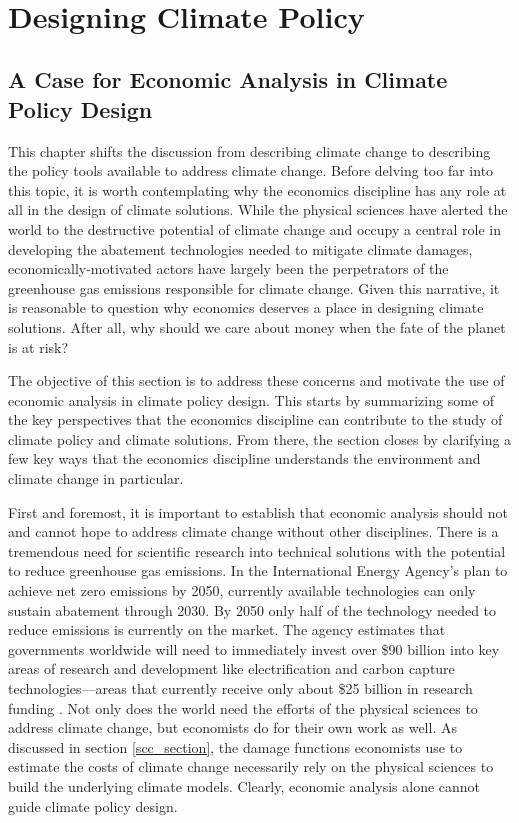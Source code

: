 ~

\newpage
\section{Designing Climate Policy}

\subsection{A Case for Economic Analysis in Climate Policy Design \label{2.1}}

This chapter shifts the discussion from describing climate change to describing the policy tools available to address climate change. Before delving too far into this topic, it is worth contemplating why the economics discipline has any role at all in the design of climate solutions. While the physical sciences have alerted the world to the destructive potential of climate change and occupy a central role in developing the abatement technologies needed to mitigate climate damages, economically-motivated actors have largely been the perpetrators of the greenhouse gas emissions responsible for climate change. Given this narrative, it is reasonable to question why economics deserves a place in designing climate solutions.  After all, why should we care about money when the fate of the planet is at risk?

The objective of this section is to address these concerns and motivate the use of economic analysis in climate policy design.  This starts by summarizing some of the key perspectives that the economics discipline can contribute to the study of climate policy and climate solutions. From there, the section closes by clarifying a few key ways that the economics discipline understands the environment and climate change in particular. 

First and foremost, it is important to establish that economic analysis should not and cannot hope to address climate change without other disciplines. There is a tremendous need for scientific research into technical solutions with the potential to reduce greenhouse gas emissions. In the International Energy Agency's plan to achieve net zero emissions by 2050, currently available technologies can only sustain abatement through 2030. By 2050 only half of the technology needed to reduce emissions is currently on the market. The agency estimates that governments worldwide will need to immediately invest over \$90 billion into key areas of research and development like electrification and carbon capture technologies---areas that currently receive only about \$25 billion in research funding \citep{ieareport}. Not only does the world need the efforts of the physical sciences to address climate change, but economists do for their own work as well. As discussed in section \ref{scc_section}, the damage functions economists use to estimate the costs of climate change necessarily rely on the physical sciences to build the underlying climate models. Clearly, economic analysis alone cannot guide climate policy design. 

